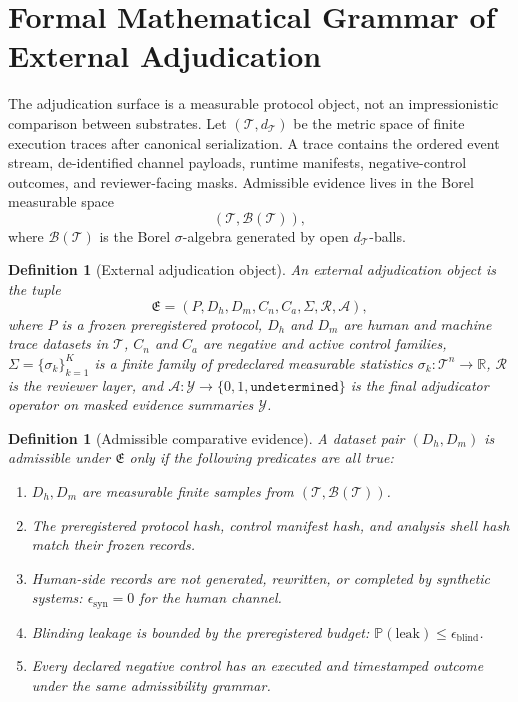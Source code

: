\documentclass[11pt,a4paper]{article}
\newtheorem{definition}[theorem]{Definition}
\begin{document}
\section{Formal Mathematical Grammar of External Adjudication}

The adjudication surface is a measurable protocol object, not an impressionistic
comparison between substrates. Let $(\mathcal{T},d_{\mathcal{T}})$ be the
metric space of finite execution traces after canonical serialization. A trace
contains the ordered event stream, de-identified channel payloads, runtime
manifests, negative-control outcomes, and reviewer-facing masks. Admissible
evidence lives in the Borel measurable space
\begin{equation}
  (\mathcal{T},\mathcal{B}(\mathcal{T})),
\end{equation}
where $\mathcal{B}(\mathcal{T})$ is the Borel $\sigma$-algebra generated by
open $d_{\mathcal{T}}$-balls.

\begin{definition}[External adjudication object]
An external adjudication object is the tuple
\begin{equation}
\mathfrak{E}=(P,D_h,D_m,C_n,C_a,\Sigma,\mathcal{R},\mathcal{A}),
\end{equation}
where $P$ is a frozen preregistered protocol, $D_h$ and $D_m$ are human and
machine trace datasets in $\mathcal{T}$, $C_n$ and $C_a$ are negative and active
control families, $\Sigma=\{\sigma_k\}_{k=1}^K$ is a finite family of
predeclared measurable statistics $\sigma_k:\mathcal{T}^n\to\mathbb{R}$,
$\mathcal{R}$ is the reviewer layer, and
$\mathcal{A}:\mathcal{Y}\to\{0,1,\mathtt{undetermined}\}$ is the final
adjudicator operator on masked evidence summaries $\mathcal{Y}$.
\end{definition}

\begin{definition}[Admissible comparative evidence]
A dataset pair $(D_h,D_m)$ is admissible under $\mathfrak{E}$ only if the
following predicates are all true:
\begin{enumerate}
  \item $D_h,D_m$ are measurable finite samples from
  $(\mathcal{T},\mathcal{B}(\mathcal{T}))$.
  \item The preregistered protocol hash, control manifest hash, and analysis
  shell hash match their frozen records.
  \item Human-side records are not generated, rewritten, or completed by
  synthetic systems: $\epsilon_{\mathrm{syn}}=0$ for the human channel.
  \item Blinding leakage is bounded by the preregistered budget:
  $\mathbb{P}(\mathrm{leak})\leq \epsilon_{\mathrm{blind}}$.
  \item Every declared negative control has an executed and timestamped outcome
  under the same admissibility grammar.
\end{enumerate}
\end{definition}
\end{document}
